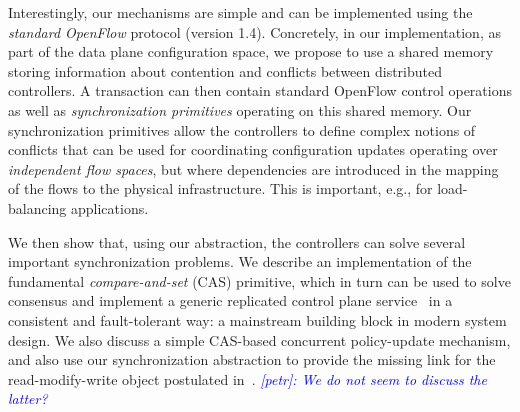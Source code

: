 \documentclass[conference]{sigcomm-alternate}
\newcommand{\petr}[1]{\textit{\textcolor{blue}{[petr]: #1}}} %
\begin{document}
Interestingly, our mechanisms are simple and can be implemented using the \emph{standard OpenFlow}
protocol (version 1.4). 
%
%
Concretely, in our implementation, 
as part of the data plane configuration space, 
we propose to use a shared memory storing information about  contention and
conflicts between distributed controllers.
A transaction can then contain standard OpenFlow control operations
as well as  \emph{synchronization primitives} operating on this shared
memory.
Our synchronization primitives allow the controllers to define complex notions
of conflicts that can be used for coordinating configuration updates operating 
over \emph{independent flow spaces}, but where dependencies are introduced
in the mapping of the flows to the physical infrastructure. This is
important, e.g., for load-balancing applications.


We then show that, using our abstraction, the controllers can
solve several important synchronization problems.
We describe an implementation of the fundamental
\emph{compare-and-set} (CAS) primitive,
which in turn can be used to solve consensus and
implement a generic replicated control plane service~\cite{Her91} in a consistent and
fault-tolerant way: a mainstream building block in
modern system design.
We also discuss a simple CAS-based concurrent policy-update mechanism,
and also use our synchronization abstraction to provide
the missing link for the read-modify-write object
postulated in~\cite{stn}. \petr{We do not seem to discuss the latter?}


\end{document}
